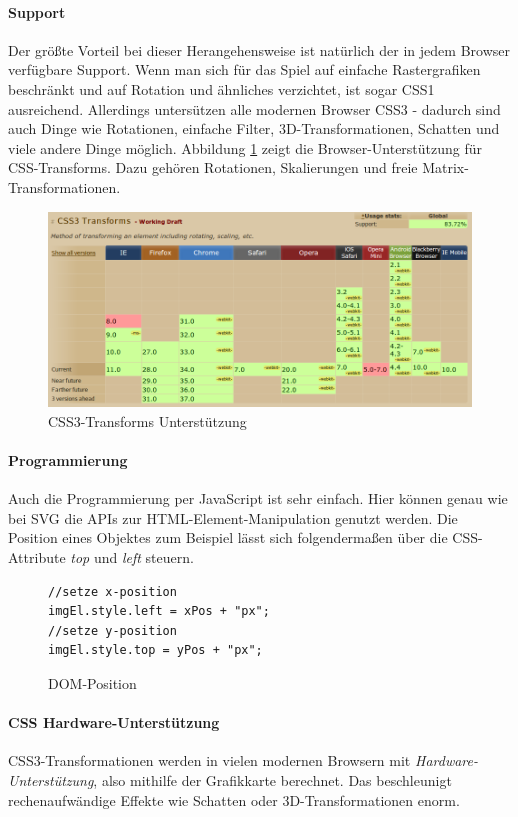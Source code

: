 \documentclass[a4paper, 12pt]{article}
\begin{document}
\paragraph{Support} Der größte Vorteil bei dieser Herangehensweise ist natürlich der in jedem Browser verfügbare Support. Wenn man sich für das Spiel auf einfache Rastergrafiken beschränkt und auf Rotation und ähnliches verzichtet, ist sogar CSS1 ausreichend. Allerdings untersützen alle modernen Browser CSS3 - dadurch sind auch Dinge wie Rotationen, einfache Filter, 3D-Transformationen, Schatten und viele andere Dinge möglich. Abbildung \ref{css_transforms_support} zeigt die Browser-Unterstützung für CSS-Transforms. Dazu gehören Rotationen, Skalierungen und freie Matrix-Transformationen. 
\begin{figure}[h!]
	\begin{center}
		\includegraphics[width=\textwidth]{assets/css_transforms_support.png} 
	\end{center}
	\caption{CSS3-Transforms Unterstützung}
	\label{css_transforms_support}
\end{figure}
\paragraph{Programmierung} Auch die Programmierung per JavaScript ist sehr einfach. Hier können genau wie bei SVG die APIs zur HTML-Element-Manipulation genutzt werden. Die Position eines Objektes zum Beispiel lässt sich folgendermaßen über die CSS-Attribute \emph{top} und \emph{left} steuern.
\begin{figure}[h!]
	\begin{verbatim}
//setze x-position
imgEl.style.left = xPos + "px";
//setze y-position
imgEl.style.top = yPos + "px";
	\end{verbatim}
	\caption{DOM-Position}
	\label{dom_position_example}
\end{figure}
\paragraph{CSS Hardware-Unterstützung} CSS3-Transformationen werden in vielen modernen Browsern mit \emph{Hardware-Unterstützung}, also mithilfe der Grafikkarte berechnet. Das beschleunigt rechenaufwändige Effekte wie Schatten oder 3D-Transformationen enorm.
\end{document}

